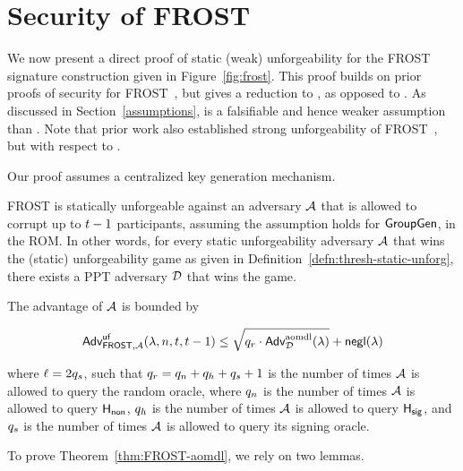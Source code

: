 \section{Security of FROST}
\label{frost:direct-proof}

We now present a direct proof of static (weak) unforgeability for the FROST signature construction given in Figure~\ref{fig:frost}.
This proof builds on prior proofs of security for FROST~\cite{BellareCKMTZ22},
but gives a reduction to \AOMDL, as opposed to \OMDL.
As discussed in Section~\ref{assumptions},
\AOMDL is a falsifiable and hence weaker assumption than \OMDL.
Note that prior work also established strong unforgeability of FROST~\cite{BellareCKMTZ22},
but with respect to \OMDL.

Our proof assumes a centralized key generation mechanism.



\begin{theorem}\label{thm:FROST-aomdl}
	FROST is statically unforgeable   against an adversary $\mathcal{A}$ that is allowed to corrupt up to $t-1$ participants,
  assuming the \AOMDL assumption holds for $\mathsf{GroupGen}$, in the ROM.
  In other words, for every static unforgeability adversary $\mathcal{A}$ that wins the (static) unforgeability game as given in Definition~\ref{defn:thresh-static-unforg},
  there exists a PPT adversary $\mathcal{D}$ that wins the \AOMDL game.

  The advantage of $\mathcal{A}$ is bounded by


  \begin{equation} \label{eq:frost-aomdl}
\textsf{\upshape Adv}^{\textrm{\upshape $\mathsf{uf}$}}_{\mathsf{FROST},\mathcal{A}}(\lambda, n, t, t-1)
    \leq \sqrt{q_r \cdot \textsf{\upshape Adv}^{\textrm{\upshape aomdl}}_{\mathcal{D}}(\lambda) } + \mathsf{negl}(\lambda)
  \end{equation}

\noindent
where $\ell = 2q_s$,
such that $q_r = q_n + q_h +  q_s + 1$ is the number of times $\mathcal{A}$ is allowed to query the random oracle,
where $q_n$ is the number of times $\mathcal{A}$ is allowed to query $\mathsf{H_{non}}$,
$q_h$ is the number of times $\mathcal{A}$ is allowed to query $\mathsf{H_{sig}}$,
and $q_s$ is the number of times $\mathcal{A}$ is allowed to query its signing oracle.

\end{theorem}

To prove Theorem~\ref{thm:FROST-aomdl},
we rely on two lemmas.

